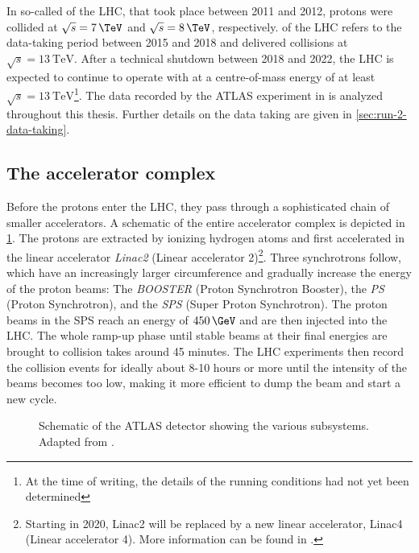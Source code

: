 In so-called \RunOne of the LHC, that took place between 2011 and 2012, protons were collided at $\sqrt{s} = 7\,\TeV$ and $\sqrt{s} = 8\,\TeV$, respectively. \RunTwo of the LHC refers to the data-taking period between 2015 and 2018 and delivered collisions at $\sqrt{s} = \SI{13}{\TeV}$. After a technical shutdown between 2018 and 2022, the LHC is expected to continue to operate with \RunThr at a centre-of-mass energy of at least $\sqrt{s} = \SI{13}{\TeV}$\footnote{At the time of writing, the details of the \RunThr running conditions had not yet been determined}.
The data recorded by the ATLAS experiment in \RunTwo is analyzed throughout this thesis. Further details on the \RunTwo data taking are given in \cref{sec:run-2-data-taking}.


\subsection{The accelerator complex}
Before the protons enter the LHC, they pass through a sophisticated chain of smaller accelerators. A schematic of the entire accelerator complex is depicted in \cref{fig:accelerator-complex}.
The protons are extracted by ionizing hydrogen atoms and first accelerated in the linear accelerator \emph{Linac2} (Linear accelerator 2)\footnote{Starting in 2020, Linac2 will be replaced by a new linear accelerator, Linac4 (Linear accelerator 4). More information can be found in .}. Three synchrotrons follow, which have an increasingly larger circumference and gradually increase the energy of the proton beams: The \emph{BOOSTER} (Proton Synchrotron Booster), the \emph{PS} (Proton Synchrotron), and the \emph{SPS} (Super Proton Synchrotron). The proton beams in the SPS reach an energy of $450\,\GeV$ and are then injected into the LHC. The whole ramp-up phase until stable beams at their final energies are brought to collision takes around 45 minutes. The LHC experiments then record the collision events for ideally about 8-10 hours or more until the intensity of the beams becomes too low, making it more efficient to dump the beam and start a new cycle.

\begin{figure}
    \caption[Schematic of the ATLAS detector showing the various subsystems.]{Schematic of the ATLAS detector showing the various subsystems. Adapted from .}
    \label{fig:accelerator-complex}
\end{figure}









